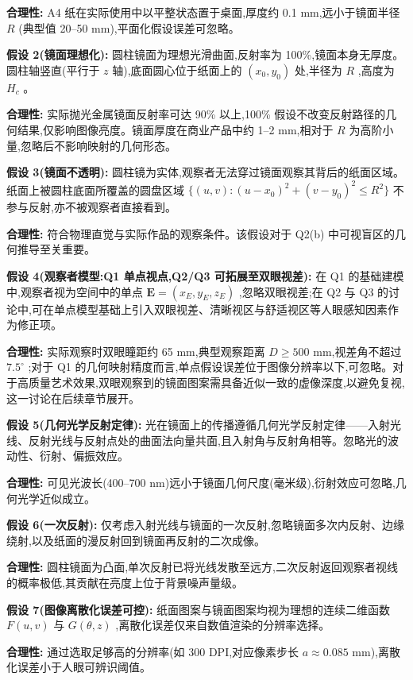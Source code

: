 \documentclass[12pt, a4paper]{ctexart}
\begin{document}
\textbf{合理性:} A4 纸在实际使用中以平整状态置于桌面,厚度约 0.1 mm,远小于镜面半径 $R$ (典型值 20–50 mm),平面化假设误差可忽略。

\textbf{假设 2(镜面理想化):} 圆柱镜面为理想光滑曲面,反射率为 100\%,镜面本身无厚度。圆柱轴竖直(平行于 $z$ 轴),底面圆心位于纸面上的 $(x_0, y_0)$ 处,半径为 $R$ ,高度为 $H_c$ 。

\textbf{合理性:} 实际抛光金属镜面反射率可达 90\% 以上,100\% 假设不改变反射路径的几何结果,仅影响图像亮度。镜面厚度在商业产品中约 1–2 mm,相对于 $R$ 为高阶小量,忽略后不影响映射的几何形态。

\textbf{假设 3(镜面不透明):} 圆柱镜为实体,观察者无法穿过镜面观察其背后的纸面区域。纸面上被圆柱底面所覆盖的圆盘区域 $\{(u, v) : (u-x_0)^2 + (v-y_0)^2 \leq R^2\}$ 不参与反射,亦不被观察者直接看到。

\textbf{合理性:} 符合物理直觉与实际作品的观察条件。该假设对于 Q2(b) 中可视盲区的几何推导至关重要。

\textbf{假设 4(观察者模型:Q1 单点视点,Q2/Q3 可拓展至双眼视差):} 在 Q1 的基础建模中,观察者视为空间中的单点 $\mathbf{E} = (x_E, y_E, z_E)$ ,忽略双眼视差;在 Q2 与 Q3 的讨论中,可在单点模型基础上引入双眼视差、清晰视区与舒适视区等人眼感知因素作为修正项。

\textbf{合理性:} 实际观察时双眼瞳距约 65 mm,典型观察距离 $D \geq 500$ mm,视差角不超过 $7.5^\circ$ ;对于 Q1 的几何映射精度而言,单点假设误差位于图像分辨率以下,可忽略。对于高质量艺术效果,双眼观察到的镜面图案需具备近似一致的虚像深度,以避免复视,这一讨论在后续章节展开。

\textbf{假设 5(几何光学反射定律):} 光在镜面上的传播遵循几何光学反射定律——入射光线、反射光线与反射点处的曲面法向量共面,且入射角与反射角相等。忽略光的波动性、衍射、偏振效应。

\textbf{合理性:} 可见光波长(400–700 nm)远小于镜面几何尺度(毫米级),衍射效应可忽略,几何光学近似成立。

\textbf{假设 6(一次反射):} 仅考虑入射光线与镜面的一次反射,忽略镜面多次内反射、边缘绕射,以及纸面的漫反射回到镜面再反射的二次成像。

\textbf{合理性:} 圆柱镜面为凸面,单次反射已将光线发散至远方,二次反射返回观察者视线的概率极低,其贡献在亮度上位于背景噪声量级。

\textbf{假设 7(图像离散化误差可控):} 纸面图案与镜面图案均视为理想的连续二维函数 $F(u, v)$ 与 $G(\theta, z)$ ,离散化误差仅来自数值渲染的分辨率选择。

\textbf{合理性:} 通过选取足够高的分辨率(如 300 DPI,对应像素步长 $a \approx 0.085$ mm),离散化误差小于人眼可辨识阈值。
\end{document}
